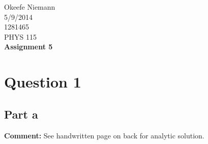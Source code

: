 \documentclass[10pt]{article}
\begin{document}
 
\begin{center}
\large
\hfill Okeefe Niemann\\
\hfill 5/9/2014\\
\hfill 1281465\\
\hfill PHYS 115 \\
\LARGE \textbf{Assignment 5}\\
\end{center}

\normalsize
\section*{Question 1}
\subsection*{Part a}
\textbf{Comment:} See handwritten page on back for analytic solution.
\end{document}
